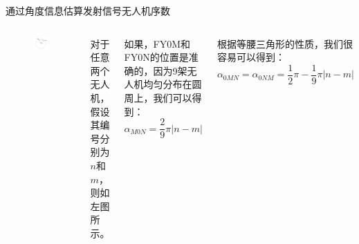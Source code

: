 \documentclass[aspectratio=169]{beamer}
\begin{document}
\begin{frame}{通过角度信息估算发射信号无人机序数}
    \begin{columns}
        \begin{figure}[!ht]
            \centering
            \includegraphics[width=\textwidth]{图片/问题1-2示意图1.pdf}
        \end{figure}

        对于任意两个无人机，假设其编号分别为$n$和$m$，则如左图所示。
        
        如果，FY0M和FY0N的位置是准确的，因为9架无人机均匀分布在圆周上，我们可以得到：
        \begin{equation}
            \alpha_{M0N} = \frac{2}{9}\pi\left|n-m\right|
        \end{equation}
    
        根据等腰三角形的性质，我们很容易可以得到：
        \begin{equation}
            \alpha_{0MN} = \alpha_{0NM} = \frac{1}{2}\pi - \frac{1}{9}\pi\left|n-m\right|
        \end{equation}
    \end{columns}
\end{frame}
\end{document}
